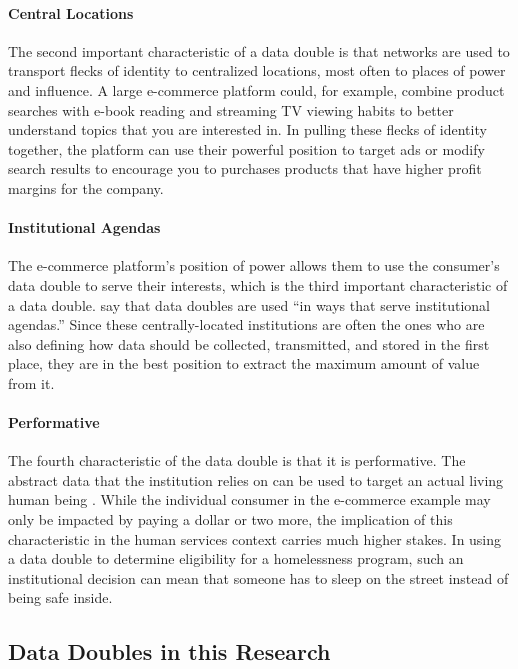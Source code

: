 \paragraph{Central Locations}
The second important characteristic of a data double is that networks are used to transport flecks of identity to centralized locations, most often to places of power and influence. A large e-commerce platform could, for example, combine product searches with e-book reading and streaming TV viewing habits to better understand topics that you are interested in. In pulling these flecks of identity together, the platform can use their powerful position to target ads or modify search results to encourage you to purchases products that have higher profit margins for the company.

\paragraph{Institutional Agendas}
The e-commerce platform's position of power allows them to use the consumer's data double to serve their interests, which is the third important characteristic of a data double. \citet{Haggerty2006New} say that data doubles are used ``in ways that serve institutional agendas.” Since these centrally-located institutions are often the ones who are also defining how data should be collected, transmitted, and stored in the first place, they are in the best position to extract the maximum amount of value from it.

\paragraph{Performative}
The fourth characteristic of the data double is that it is performative. The abstract data that the institution relies on can be used to target an actual living human being \citep{Raley2013Dataveillance}. While the individual consumer in the e-commerce example may only be impacted by paying a dollar or two more, the implication of this characteristic in the human services context carries much higher stakes. In using a data double to determine eligibility for a homelessness program, such an institutional decision can mean that someone has to sleep on the street instead of being safe inside.

\subsection{Data Doubles in this Research}

